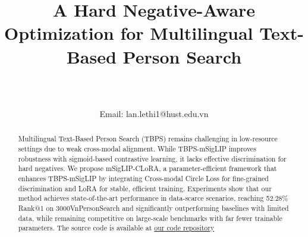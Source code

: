 \documentclass[conference]{IEEEtran}
\begin{document}
\title{A Hard Negative-Aware Optimization for Multilingual Text-Based Person Search\\


 \author{
 \\


Email: lan.lethi1@hust.edu.vn
 }
}
\maketitle

\begin{abstract}
Multilingual Text-Based Person Search (TBPS) remains challenging in low-resource settings due to weak cross-modal alignment. While TBPS-mSigLIP improves robustness with sigmoid-based contrastive learning, it lacks effective discrimination for hard negatives. We propose mSigLIP-CLoRA, a parameter-efficient framework that enhances TBPS-mSigLIP by integrating Cross-modal Circle Loss for fine-grained discrimination and LoRA for stable, efficient training. Experiments show that our method achieves state-of-the-art performance in data-scarce scenarios, reaching 52.28\% Rank@1 on 3000VnPersonSearch and significantly outperforming baselines with limited data, while remaining competitive on large-scale benchmarks with far fewer trainable parameters. The source code is available at \href{https://github.com/pahmlam/Research_on_CircleLoss_for_TBPS-mSigLIP.git}{our code repository}
\end{abstract}
\end{document}
